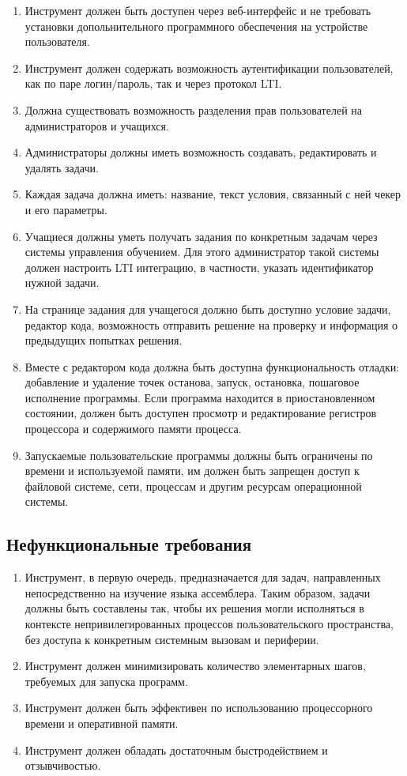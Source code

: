 \documentclass[a4paper,article,14pt]{extarticle}
\begin{document}
\begin{enumerate}
    \item Инструмент должен быть доступен через веб-интерфейс и не требовать установки допольнительного программного обеспечения на устройстве пользователя.
    \item Инструмент должен содержать возможность аутентификации пользователей, как по паре логин/пароль, так и через протокол LTI.
    \item Должна существовать возможность разделения прав пользователей на администраторов и учащихся.
    \item Администраторы должны иметь возможность создавать, редактировать и удалять задачи.
    \item Каждая задача должна иметь: название, текст условия, связанный с ней чекер и его параметры.
    \item Учащиеся должны уметь получать задания по конкретным задачам через системы управления обучением. Для этого администратор такой системы должен настроить LTI интеграцию, в частности, указать идентификатор нужной задачи.
    \item На странице задания для учащегося должно быть доступно условие задачи, редактор кода, возможность отправить решение на проверку и информация о предыдущих попытках решения.
    \item Вместе с редактором кода должна быть доступна функциональность отладки: добавление и удаление точек останова, запуск, остановка, пошаговое исполнение программы. Если программа находится в приостановленном состоянии, должен быть доступен просмотр и редактирование регистров процессора и содержимого памяти процесса.
    \item Запускаемые пользовательские программы должны быть ограничены по времени и используемой памяти, им должен быть запрещен доступ к файловой системе, сети, процессам и другим ресурсам операционной системы.
\end{enumerate}

\subsection{Нефункциональные требования}

\begin{enumerate}
    \item Инструмент, в первую очередь, предназначается для задач, направленных непосредственно на изучение языка ассемблера. Таким образом, задачи должны быть составлены так, чтобы их решения могли исполняться в контексте непривилегированных процессов пользовательского пространства, без доступа к конкретным системным вызовам и периферии.
    \item Инструмент должен минимизировать количество элементарных шагов, требуемых для запуска программ.
    \item Инструмент должен быть эффективен по использованию процессорного времени и оперативной памяти.
    \item Инструмент должен обладать достаточным быстродействием и отзывчивостью.
\end{enumerate}
\end{document}

